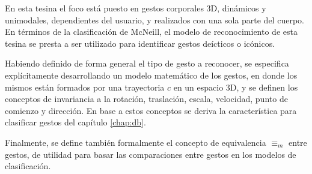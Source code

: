 En esta tesina el foco está puesto en gestos corporales 3D, dinámicos y unimodales, dependientes del usuario, y realizados con una sola parte del cuerpo. En términos de la clasificación de McNeill, el modelo de reconocimiento de esta tesina se presta a ser utilizado para identificar gestos deícticos o icónicos.

Habiendo definido de forma general el tipo de gesto a reconocer, se especifica explícitamente desarrollando un modelo matemático de los gestos, en donde los mismos están formados por una trayectoria $c$ en un espacio 3D, y se definen los conceptos de invariancia a la rotación, traslación, escala, velocidad, punto de comienzo y dirección. En base a estos conceptos se deriva la característica para clasificar gestos del capítulo \ref{chap:db}.

Finalmente, se define también formalmente el concepto de equivalencia $\equiv_m$ entre gestos, de utilidad para basar las comparaciones entre gestos en los modelos de clasificación.
 

